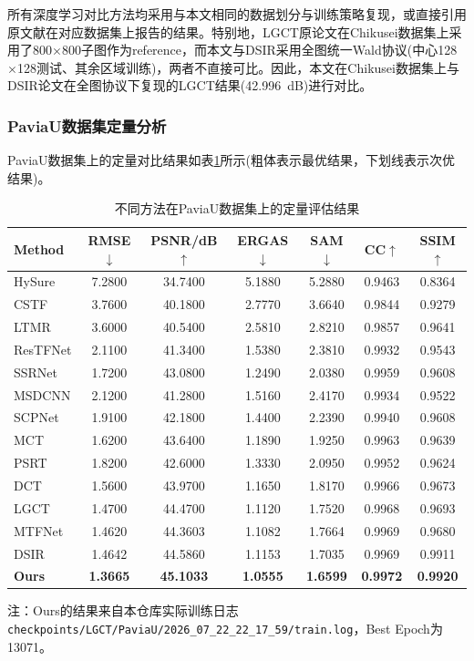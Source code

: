 \documentclass[UTF8,a4paper,11pt]{ctexart}
\newcommand{\best}[1]{\textbf{#1}}
\begin{document}
所有深度学习对比方法均采用与本文相同的数据划分与训练策略复现，或直接引用原文献在对应数据集上报告的结果。特别地，LGCT原论文在Chikusei数据集上采用了800$\times$800子图作为reference，而本文与DSIR采用全图统一Wald协议(中心128$\times$128测试、其余区域训练)，两者不直接可比。因此，本文在Chikusei数据集上与DSIR论文在全图协议下复现的LGCT结果(42.996~dB)进行对比。

\subsubsection{PaviaU数据集定量分析}
PaviaU数据集上的定量对比结果如表\ref{tab:paviau}所示(粗体表示最优结果，下划线表示次优结果)。

\begin{table}[!htbp]
\centering\small
\caption{不同方法在PaviaU数据集上的定量评估结果}
\label{tab:paviau}
\begin{tabular}{@{}lcccccc@{}}
\toprule
Method & RMSE$\downarrow$ & PSNR/dB$\uparrow$ & ERGAS$\downarrow$ & SAM$\downarrow$ & CC$\uparrow$ & SSIM$\uparrow$ \\
\midrule
HySure   & 7.2800 & 34.7400 & 5.1880 & 5.2880 & 0.9463 & 0.8364 \\
CSTF     & 3.7600 & 40.1800 & 2.7770 & 3.6640 & 0.9844 & 0.9279 \\
LTMR     & 3.6000 & 40.5400 & 2.5810 & 2.8210 & 0.9857 & 0.9641 \\
ResTFNet & 2.1100 & 41.3400 & 1.5380 & 2.3810 & 0.9932 & 0.9543 \\
SSRNet   & 1.7200 & 43.0800 & 1.2490 & 2.0380 & 0.9959 & 0.9608 \\
MSDCNN   & 2.1200 & 41.2800 & 1.5160 & 2.4170 & 0.9934 & 0.9522 \\
SCPNet   & 1.9100 & 42.1800 & 1.4400 & 2.2390 & 0.9940 & 0.9608 \\
MCT      & 1.6200 & 43.6400 & 1.1890 & 1.9250 & 0.9963 & 0.9639 \\
PSRT     & 1.8200 & 42.6000 & 1.3330 & 2.0950 & 0.9952 & 0.9624 \\
DCT      & 1.5600 & 43.9700 & 1.1650 & 1.8170 & 0.9966 & 0.9673 \\
LGCT     & 1.4700 & 44.4700 & 1.1120 & 1.7520 & 0.9968 & 0.9693 \\
MTFNet   & 1.4620 & 44.3603 & 1.1082 & 1.7664 & 0.9969 & 0.9680 \\
DSIR     & 1.4642 & 44.5860 & 1.1153 & 1.7035 & 0.9969 & 0.9911 \\
\textbf{Ours} & \best{1.3665} & \best{45.1033} & \best{1.0555} & \best{1.6599} & \best{0.9972} & \best{0.9920} \\
\bottomrule
\end{tabular}

\vspace{4pt}
{\footnotesize 注：Ours的结果来自本仓库实际训练日志 \texttt{checkpoints/LGCT/PaviaU/2026\_07\_22\_22\_17\_59/train.log}，Best Epoch为13071。}
\end{table}
\end{document}

